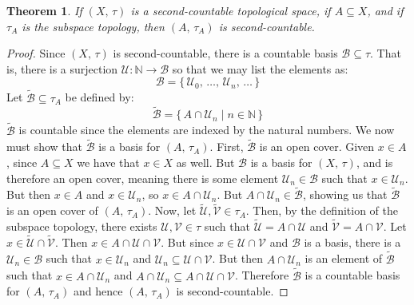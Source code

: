\documentclass{article}
\theoremstyle{plain}
\newtheorem{theorem}{Theorem}[section]
\theoremstyle{normal}
\begin{document}
        \begin{theorem}
            If $(X,\,\tau)$ is a second-countable topological space, if
            $A\subseteq{X}$, and if $\tau_{A}$ is the subspace topology, then
            $(A,\,\tau_{A})$ is second-countable.
        \end{theorem}
        \begin{proof}
            Since $(X,\,\tau)$ is second-countable, there is a countable basis
            $\mathcal{B}\subseteq\tau$. That is, there is a surjection
            $\mathcal{U}:\mathbb{N}\rightarrow\mathcal{B}$ so that we may list
            the elements as:
            \begin{equation}
                \mathcal{B}=
                \{\,\mathcal{U}_{0},\,\dots,\,\mathcal{U}_{n},\,\dots\,\}
            \end{equation}
            Let $\tilde{\mathcal{B}}\subseteq\tau_{A}$ be defined by:
            \begin{equation}
                \tilde{\mathcal{B}}
                =\{\,A\cap\mathcal{U}_{n}\;|\;n\in\mathbb{N}\,\}
            \end{equation}
            $\tilde{\mathcal{B}}$ is countable since the elements are indexed
            by the natural numbers. We now must show that $\tilde{\mathcal{B}}$
            is a basis for $(A,\,\tau_{A})$. First, $\tilde{\mathcal{B}}$ is an
            open cover. Given $x\in{A}$, since $A\subseteq{X}$ we have that
            $x\in{X}$ as well. But $\mathcal{B}$ is a basis for $(X,\,\tau)$,
            and is therefore an open cover, meaning there is some element
            $\mathcal{U}_{n}\in\mathcal{B}$ such that $x\in\mathcal{U}_{n}$.
            But then $x\in{A}$ and $x\in\mathcal{U}_{n}$, so
            $x\in{A}\cap\mathcal{U}_{n}$. But
            $A\cap\mathcal{U}_{n}\in\tilde{\mathcal{B}}$, showing us that
            $\tilde{\mathcal{B}}$ is an open cover of $(A,\,\tau_{A})$. Now,
            let $\tilde{\mathcal{U}},\tilde{\mathcal{V}}\in\tau_{A}$. Then, by
            the definition of the subspace topology, there exists
            $\mathcal{U},\mathcal{V}\in\tau$ such that
            $\tilde{\mathcal{U}}=A\cap\mathcal{U}$ and
            $\tilde{\mathcal{V}}=A\cap\mathcal{V}$. Let
            $x\in\tilde{\mathcal{U}}\cap\tilde{\mathcal{V}}$. Then
            $x\in{A}\cap\mathcal{U}\cap\mathcal{V}$. But since
            $x\in\mathcal{U}\cap\mathcal{V}$ and $\mathcal{B}$ is a basis,
            there is a $\mathcal{U}_{n}\in\mathcal{B}$ such that
            $x\in\mathcal{U}_{n}$ and
            $\mathcal{U}_{n}\subseteq\mathcal{U}\cap\mathcal{V}$. But then
            $A\cap\mathcal{U}_{n}$ is an element of $\tilde{\mathcal{B}}$ such
            that $x\in{A}\cap\mathcal{U}_{n}$ and
            $A\cap\mathcal{U}_{n}\subseteq{A}\cap\mathcal{U}\cap\mathcal{V}$.
            Therefore $\tilde{\mathcal{B}}$ is a countable basis for
            $(A,\,\tau_{A})$ and hence $(A,\,\tau_{A})$ is second-countable.
        \end{proof}
\end{document}

